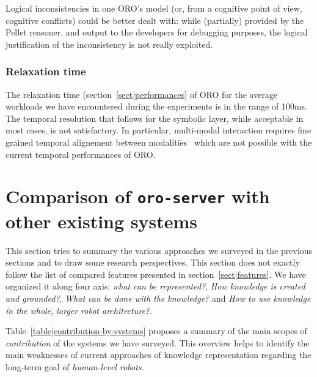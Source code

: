 Logical inconsistencies in one ORO's model (or, from a cognitive point of view,
cognitive conflicts) could be better dealt with: while (partially) provided by
the Pellet reasoner, and output to the developers for debugging purposes, the
logical justification of the inconsistency is not really exploited.



\subsubsection{Relaxation time}

The relaxation time (section~\ref{sect|performances} of ORO for the average
workloads we have encountered during the experiments is in the range of 100ms.
The temporal resolution that follows for the symbolic layer, while acceptable
in most cases, is not satisfactory. In particular, multi-modal interaction
requires fine grained temporal alignement between modalities~\cite{Li2012}
which are not possible with the current temporal performances of ORO.


\section{Comparison of {\tt oro-server} with other existing systems}
\label{sect|evaluation-oroserver}

This section tries to summary the various approaches we surveyed in the
previous sections and to draw some research perspectives. This section does not
exactly follow the list of compared features presented in
section~\ref{sect|features}. We have organized it along four axis: \emph{what
can be represented?}, \emph{How knowledge is created and grounded?}, \emph{What
can be done with the knowledge?} and \emph{How to use knowledge in the whole,
larger robot architecture?}.

Table~\ref{table|contribution-by-systems} proposes a summary of the main scopes
of \emph{contribution} of the systems we have surveyed. This overview helps to
identify the main weaknesses of current approaches of knowledge representation
regarding the long-term goal of \emph{human-level robots}.

